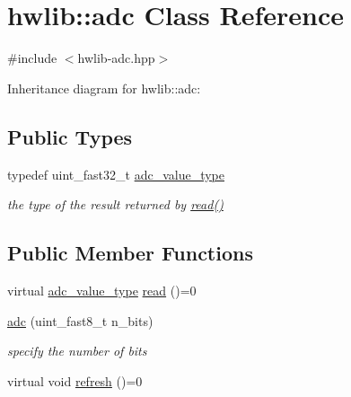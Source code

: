 \hypertarget{classhwlib_1_1adc}{}\section{hwlib\+:\+:adc Class Reference}
\label{classhwlib_1_1adc}


{\ttfamily \#include $<$hwlib-\/adc.\+hpp$>$}



Inheritance diagram for hwlib\+:\+:adc\+:
\subsection*{Public Types}
\begin{DoxyCompactItemize}
\item 
\mbox{\label{classhwlib_1_1adc_a1faacac0cc2f78e90652b17250cbe159}} 
typedef uint\+\_\+fast32\+\_\+t \hyperlink{classhwlib_1_1adc_a1faacac0cc2f78e90652b17250cbe159}{adc\+\_\+value\+\_\+type}
\begin{DoxyCompactList}\small\item\em the type of the result returned by \hyperlink{classhwlib_1_1adc_ac39b506d3ae4eec08caa5aa7e69ab2fb}{read()} \end{DoxyCompactList}\end{DoxyCompactItemize}
\subsection*{Public Member Functions}
\begin{DoxyCompactItemize}
\item 
virtual \hyperlink{classhwlib_1_1adc_a1faacac0cc2f78e90652b17250cbe159}{adc\+\_\+value\+\_\+type} \hyperlink{classhwlib_1_1adc_ac39b506d3ae4eec08caa5aa7e69ab2fb}{read} ()=0
\item 
\mbox{\label{classhwlib_1_1adc_a88335c0ccb13ac26819e8727fe7a0e63}} 
\hyperlink{classhwlib_1_1adc_a88335c0ccb13ac26819e8727fe7a0e63}{adc} (uint\+\_\+fast8\+\_\+t n\+\_\+bits)
\begin{DoxyCompactList}\small\item\em specify the number of bits \end{DoxyCompactList}\item 
virtual void \hyperlink{classhwlib_1_1adc_a5484571b18d647ec78ba97e94c7ed836}{refresh} ()=0
\end{DoxyCompactItemize}
